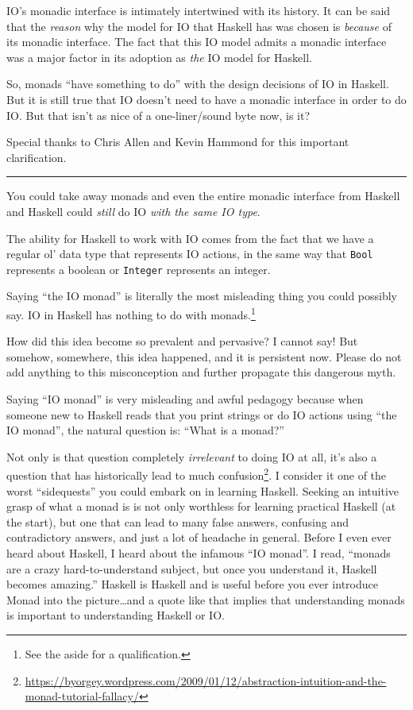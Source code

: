 \documentclass[]{article}
\renewcommand{\href}[2]{#2\footnote{\url{#1}}}
\begin{document}
IO's monadic interface is intimately intertwined with its history. It can be
said that the \emph{reason} why the model for IO that Haskell has was chosen is
\emph{because} of its monadic interface. The fact that this IO model admits a
monadic interface was a major factor in its adoption as \emph{the} IO model for
Haskell.

So, monads ``have something to do'' with the design decisions of IO in Haskell.
But it is still true that IO doesn't need to have a monadic interface in order
to do IO. But that isn't as nice of a one-liner/sound byte now, is it?

Special thanks to Chris Allen and Kevin Hammond for this important
clarification.

\begin{center}\rule{0.5\linewidth}{\linethickness}\end{center}

You could take away monads and even the entire monadic interface from Haskell
and Haskell could \emph{still} do IO \emph{with the same IO type}.

The ability for Haskell to work with IO comes from the fact that we have a
regular ol' data type that represents IO actions, in the same way that
\texttt{Bool} represents a boolean or \texttt{Integer} represents an integer.

Saying ``the IO monad'' is literally the most misleading thing you could
possibly say. IO in Haskell has nothing to do with monads.\footnote{See the
  aside for a qualification.}

How did this idea become so prevalent and pervasive? I cannot say! But somehow,
somewhere, this idea happened, and it is persistent now. Please do not add
anything to this misconception and further propagate this dangerous myth.

Saying ``IO monad'' is very misleading and awful pedagogy because when someone
new to Haskell reads that you print strings or do IO actions using ``the IO
monad'', the natural question is: ``What is a monad?''

Not only is that question completely \emph{irrelevant} to doing IO at all, it's
also a question that has
\href{https://byorgey.wordpress.com/2009/01/12/abstraction-intuition-and-the-monad-tutorial-fallacy/}{historically
lead to much confusion}. I consider it one of the worst ``sidequests'' you could
embark on in learning Haskell. Seeking an intuitive grasp of what a monad is is
not only worthless for learning practical Haskell (at the start), but one that
can lead to many false answers, confusing and contradictory answers, and just a
lot of headache in general. Before I even ever heard about Haskell, I heard
about the infamous ``IO monad''. I read, ``monads are a crazy hard-to-understand
subject, but once you understand it, Haskell becomes amazing.'' Haskell is
Haskell and is useful before you ever introduce Monad into the picture\ldots and
a quote like that implies that understanding monads is important to
understanding Haskell or IO.
\end{document}
